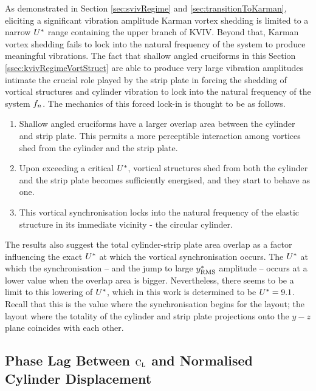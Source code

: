 \documentclass[oneside]{utmthesis}
\begin{document}
As demonstrated in Section \ref{sec:svivRegime} and \ref{sec:transitionToKarman}, eliciting a significant vibration amplitude Karman vortex shedding is limited to a narrow $U^{*}$ range containing the upper branch of KVIV. Beyond that, Karman vortex shedding fails to lock into the natural frequency of the system to produce meaningful vibrations. The fact that shallow angled cruciforms in this Section \ref{ssec:kvivRegimeVortStruct} are able to produce very large vibration amplitudes intimate the crucial role played by the strip plate in forcing the shedding of vortical structures and cylinder vibration to lock into the natural frequency of the system $f_{n}$. The mechanics of this forced lock-in is thought to be as follows.

\begin{enumerate}
  \item Shallow angled cruciforms have a larger overlap area between the cylinder and strip plate. This permits a more perceptible interaction among vortices shed from the cylinder and the strip plate.
  \item Upon exceeding a critical $U^{*}$, vortical structures shed from both the cylinder and the strip plate becomes sufficiently energised, and they start to behave as one.
  \item This vortical synchronisation locks into the natural frequency of the elastic structure in its immediate vicinity - the circular cylinder.
\end{enumerate}

The results also suggest the total cylinder-strip plate area overlap as a factor influencing the exact $U^{*}$ at which the vortical synchronisation occurs. The $U^{*}$ at which the synchronisation -- and the jump to large $y^{*}_{\text{RMS}}$ amplitude -- occurs at a lower value when the overlap area is bigger. Nevertheless, there seems to be a limit to this lowering of $U^{*}$, which in this work is determined to be $U^{*} = 9.1$. Recall that this is the value where the synchronisation begins for the \angon{} layout; the layout where the totality of the cylinder and strip plate projections onto the $y-z$ plane coincides with each other.

\subsection{Phase Lag Between $\text{C}_{\text{L}}$ and Normalised Cylinder Displacement} \label{ssec:phaseLag22500}
\end{document}
